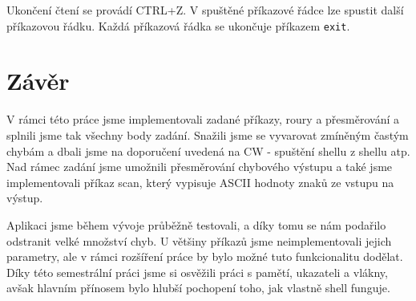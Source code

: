 \documentclass[a4paper]{article}
\begin{document}
Ukončení čtení se provádí CTRL+Z. 
V spuštěné příkazové řádce lze spustit další příkazovou řádku. Každá příkazová řádka se ukončuje příkazem \verb+exit+. 



\section{Závěr}

V rámci této práce jsme implementovali zadané příkazy, roury a přesměrování a splnili jsme tak všechny body zadání. Snažili jsme se vyvarovat zmíněným častým chybám a dbali jsme na doporučení uvedená na CW - spuštění shellu z shellu atp. Nad rámec zadání jsme umožnili přesměrování chybového výstupu a také jsme implementovali příkaz scan, který vypisuje ASCII hodnoty znaků ze vstupu na výstup.

Aplikaci jsme během vývoje průběžně testovali, a díky tomu se nám podařilo odstranit velké množství chyb. U většiny příkazů jsme neimplementovali jejich parametry, ale v rámci rozšíření práce by bylo možné tuto funkcionalitu dodělat.
Díky této semestrální práci jsme si osvěžili práci s pamětí, ukazateli a vlákny, avšak hlavním přínosem bylo hlubší pochopení toho, jak vlastně shell funguje.
\end{document}
